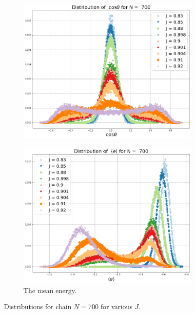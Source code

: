   \begin{figure}
 	\centering
 	\captionsetup{justification=centering}
 	\begin{subfigure}[b]{0.45\textwidth}
 		\includegraphics[width=\textwidth]{Images/distr_cos_700.png}
 		\label{fig:Distributions_3D_cos}
 	\end{subfigure}
 	\begin{subfigure}[b]{0.45\textwidth}
 		\includegraphics[width=\textwidth]{Images/distr_energy_700.png}
 		\caption{ The mean energy.  }
 		\label{fig:Distributions_3D_energy}
 	\end{subfigure}
 	\caption{ Distributions for chain $N=700$ for various $J$.  }
 	\label{fig:Distributions_3D}
 \end{figure}


